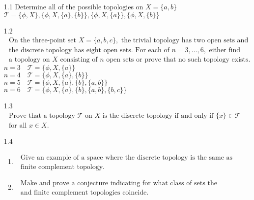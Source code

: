 \documentclass[12pt]{article}
\begin{document}
\begin{enumerate}
	\item[1.1] Determine all of the possible topologies on  $ X =\{a,b\}$\\
			$ \mathcal{ T } = \{\phi, X\},\{\phi,X,\{a\},\{b\}\},\{\phi,X,\{a\}\},\{\phi,X,\{b\}\}   $
	\item[1.2]$  \begin{array} { l } { \text { On the three-point set } X = \{ a , b , c \} , \text { the trivial topology has two open sets and } } \\ { \text { the discrete topology has eight open sets. For each of } n = 3 , \ldots , 6 , \text { either find } } \\ { \text { a topology on } X \text { consisting of } n \text { open sets or prove that no such topology exists. } } \end{array} $\\
	$n=3 \quad \mathcal{ T }= \{\phi,X,\{a\}\} $\\
	$n=4 \quad \mathcal{ T }= \{\phi,X,\{a\},\{b\}\} $\\
	$n=5 \quad \mathcal{ T }= \{\phi,X,\{a\},\{b\},\{a,b\}\} $\\
	$n=6 \quad \mathcal{ T }= \{\phi,X,\{a\},\{b\},\{a,b\},\{b,c\}\} $\\
	
	\item[1.3]$  \begin{array} { l } { \text { Prove that a topology } \mathcal { T } \text { on } X \text { is the discrete topology if and only if } \{ x \} \in \mathcal { T } } \\ { \text { for all } x \in X . } \end{array} $
	
	\item[1.4] \begin{enumerate}
				\item $ \begin{array} { l } { \text { Give an example of a space where the discrete topology is the same as the } } \\ { \text { finite complement topology. } } \end{array} $
				\item$  \begin{array} { l } { \text { Make and prove a conjecture indicating for what class of sets the discrete } } \\ { \text { and finite complement topologies coincide. } } \end{array}$
			\end{enumerate}
	

\end{enumerate}
\end{document}
